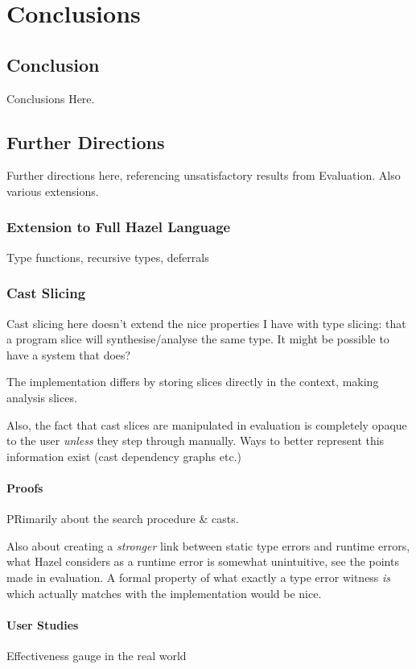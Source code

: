 \chapter{Conclusions}\label{chap:Conclusions}

\section{Conclusion}
Conclusions Here.

\section{Further Directions}
Further directions here, referencing unsatisfactory results from Evaluation. Also various extensions.
\subsection{Extension to Full Hazel Language}
Type functions, recursive types, deferrals

\subsection{Cast Slicing}
Cast slicing here doesn't extend the nice properties I have with type slicing: that a program slice will synthesise/analyse the same type. It might be possible to have a system that does?

The implementation differs by storing slices directly in the context, making analysis slices.

Also, the fact that cast slices are manipulated in evaluation is completely opaque to the user \textit{unless} they step through manually. Ways to better represent this information exist (cast dependency graphs etc.)

\subsubsection{Proofs}
PRimarily about the search procedure \& casts. 

Also about creating a \textit{stronger} link between static type errors and runtime errors, what Hazel considers as a runtime error is somewhat unintuitive, see the points made in evaluation. A formal property of what exactly a type error witness \textit{is} which actually matches with the implementation would be nice.

\subsubsection{User Studies}
Effectiveness gauge in the real world

